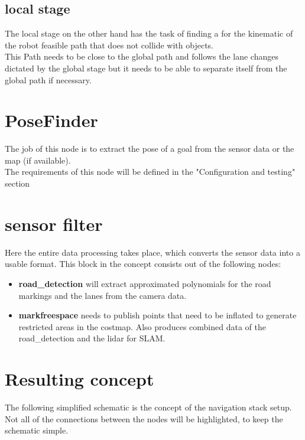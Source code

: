 \subsection{local stage}
The local stage on the other hand has the task of finding a for the kinematic of the robot feasible path that does not collide with objects.\\
This Path needs to be close to the global path and follows the lane changes dictated by the global stage but it needs to be able to separate itself from the global path if necessary.

\section{PoseFinder}
The job of this node is to extract the pose of a goal from the sensor data or the map (if available).\\

The requirements of this node will be defined in the "Configuration and testing" section
\section{sensor filter}
Here the entire data processing takes place, which converts the sensor data into a usable format. This block in the concept consists out of the following nodes:

\begin{itemize}
	\item \textbf{road\_detection} will extract approximated polynomials for the road markings and the lanes from the camera data.
	\item \textbf{markfreespace} needs to publish points that need to be inflated to generate restricted areas in the costmap. Also produces combined data of the road\_detection and the lidar for SLAM.
\end{itemize}


\section{Resulting concept}
The following simplified schematic is the concept of the navigation stack setup. Not all of the connections between the nodes will be highlighted, to keep the schematic simple.\\

